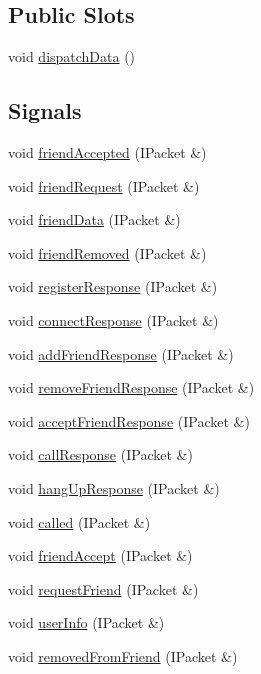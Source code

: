 \subsection*{Public Slots}
\begin{DoxyCompactItemize}
\item 
void \mbox{\hyperlink{classTcpClient_a6c7f9f64e043cadc545c692fe1c4dec2}{dispatch\+Data}} ()
\end{DoxyCompactItemize}
\subsection*{Signals}
\begin{DoxyCompactItemize}
\item 
void \mbox{\hyperlink{classTcpClient_a2b6f00394075b596127c417fac45b5da}{friend\+Accepted}} (I\+Packet \&)
\item 
void \mbox{\hyperlink{classTcpClient_a4ede0ee4ad93fcbae3936d14b35a4219}{friend\+Request}} (I\+Packet \&)
\item 
void \mbox{\hyperlink{classTcpClient_a46d4348145c683e36d96b1d5f212ccda}{friend\+Data}} (I\+Packet \&)
\item 
void \mbox{\hyperlink{classTcpClient_abe865ff0c9d713996ecc9f075e60f385}{friend\+Removed}} (I\+Packet \&)
\item 
void \mbox{\hyperlink{classTcpClient_ae8f13f6c21be76ec608a7b237bcef2b4}{register\+Response}} (I\+Packet \&)
\item 
void \mbox{\hyperlink{classTcpClient_af62b0f0df25668909e89371627175b5d}{connect\+Response}} (I\+Packet \&)
\item 
void \mbox{\hyperlink{classTcpClient_af7fdccf91cf3ffbcac15ee990cec7ce1}{add\+Friend\+Response}} (I\+Packet \&)
\item 
void \mbox{\hyperlink{classTcpClient_aacf72c0c3b2d584d5f50d68c947c019e}{remove\+Friend\+Response}} (I\+Packet \&)
\item 
void \mbox{\hyperlink{classTcpClient_a93278acf62ba04664c25982d684e7adb}{accept\+Friend\+Response}} (I\+Packet \&)
\item 
void \mbox{\hyperlink{classTcpClient_a0bebb817bfbe77f8a62bb95c0610280a}{call\+Response}} (I\+Packet \&)
\item 
void \mbox{\hyperlink{classTcpClient_aedf88dc10ff63efacbee75f31cde9ae1}{hang\+Up\+Response}} (I\+Packet \&)
\item 
void \mbox{\hyperlink{classTcpClient_a47aeee18bba9fb42fb9f97b2df5c6428}{called}} (I\+Packet \&)
\item 
void \mbox{\hyperlink{classTcpClient_acf222bab2230a499ec395f03cf74d2a1}{friend\+Accept}} (I\+Packet \&)
\item 
void \mbox{\hyperlink{classTcpClient_aa41f3248c41f99e814b4079fc86296c9}{request\+Friend}} (I\+Packet \&)
\item 
void \mbox{\hyperlink{classTcpClient_a04e4646cffdbf6842e57c92eced0324d}{user\+Info}} (I\+Packet \&)
\item 
void \mbox{\hyperlink{classTcpClient_aac9f588d2fddb91c6a0427bca1dc94cb}{removed\+From\+Friend}} (I\+Packet \&)
\end{DoxyCompactItemize}
